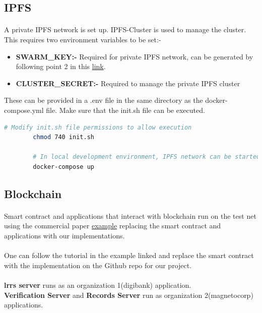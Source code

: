 \documentclass{article}
\begin{document}
    \subsection{IPFS}
        \paragraph{}
        A private IPFS network is set up. IPFS-Cluster is used to manage the cluster. This requires two environment variables to be set:-
        \begin{itemize}
            \item \textbf{SWARM\_KEY:-} Required for private IPFS network, can be generated by following point 2 in this \href{https://github.com/ahester57/ipfs-private-swarm}{link}.
            \item \textbf{CLUSTER\_SECRET:-} Required to manage the private IPFS cluster
        \end{itemize}
    
        These can be provided in a .env file in the same directory as the docker-compose.yml file.
        Make sure that the init.sh file can be executed.
    
        \begin{lstlisting}[language=bash, caption=IPFS]
        # Modify init.sh file permissions to allow execution
        chmod 740 init.sh
        
        # In local development environment, IPFS network can be started by using the command:-
        docker-compose up
        \end{lstlisting}
    
        \subsection{Blockchain}
    
        \paragraph{}
        Smart contract and applications that interact with blockchain run on the test net using the commercial paper \href{https://hyperledger-fabric.readthedocs.io/en/latest/tutorial/commercial_paper.html}{example} replacing the smart contract and applications with our implementations.
        
        \paragraph{}
        One can follow the tutorial in the example linked and replace the smart contract with the implementation on the Github repo for our project.\\
        \\
        \textbf{\gls{lrrs} server} runs as an organization 1(digibank) application.\\
        \textbf{Verification Server} and \textbf{Records Server} run as organization 2(magnetocorp) applications.
    
\end{document}
